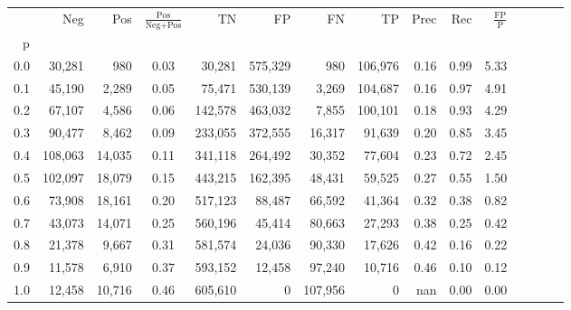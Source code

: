 \begin{tabular}{rrrcrrrrrrrrrrr}
\toprule
{} &      Neg &     Pos & $\frac{\text{Pos}}{\text{Neg}+\text{Pos}}$ &       TN &       FP &       FN &       TP &  Prec &   Rec & $\frac{\text{FP}}{\text{P}}$ \\
p   &          &         &                                            &          &          &          &          &       &       &                              \\
\midrule
0.0 &   30,281 &     980 &                                       0.03 &   30,281 &  575,329 &      980 &  106,976 &  0.16 &  0.99 &                         5.33 \\
0.1 &   45,190 &   2,289 &                                       0.05 &   75,471 &  530,139 &    3,269 &  104,687 &  0.16 &  0.97 &                         4.91 \\
0.2 &   67,107 &   4,586 &                                       0.06 &  142,578 &  463,032 &    7,855 &  100,101 &  0.18 &  0.93 &                         4.29 \\
0.3 &   90,477 &   8,462 &                                       0.09 &  233,055 &  372,555 &   16,317 &   91,639 &  0.20 &  0.85 &                         3.45 \\
0.4 &  108,063 &  14,035 &                                       0.11 &  341,118 &  264,492 &   30,352 &   77,604 &  0.23 &  0.72 &                         2.45 \\
0.5 &  102,097 &  18,079 &                                       0.15 &  443,215 &  162,395 &   48,431 &   59,525 &  0.27 &  0.55 &                         1.50 \\
0.6 &   73,908 &  18,161 &                                       0.20 &  517,123 &   88,487 &   66,592 &   41,364 &  0.32 &  0.38 &                         0.82 \\
0.7 &   43,073 &  14,071 &                                       0.25 &  560,196 &   45,414 &   80,663 &   27,293 &  0.38 &  0.25 &                         0.42 \\
0.8 &   21,378 &   9,667 &                                       0.31 &  581,574 &   24,036 &   90,330 &   17,626 &  0.42 &  0.16 &                         0.22 \\
0.9 &   11,578 &   6,910 &                                       0.37 &  593,152 &   12,458 &   97,240 &   10,716 &  0.46 &  0.10 &                         0.12 \\
1.0 &   12,458 &  10,716 &                                       0.46 &  605,610 &        0 &  107,956 &        0 &   nan &  0.00 &                         0.00 \\
\bottomrule
\end{tabular}
